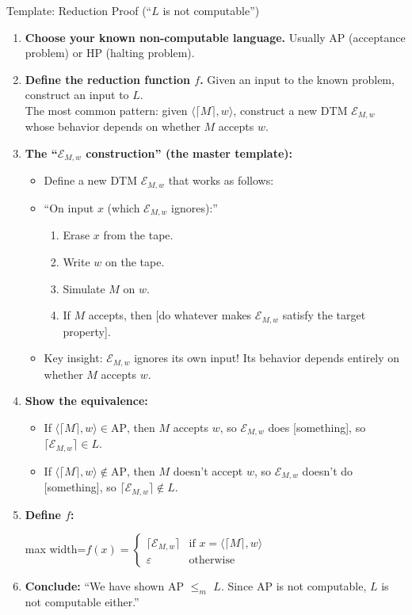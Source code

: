 \documentclass[11pt,a4paper]{article}
\newcommand{\fitmath}[1]{\begin{adjustbox}{max width=\linewidth}$\displaystyle #1$\end{adjustbox}}
\begin{document}
\begin{templatebox}{Template: Reduction Proof (``$L$ is not computable'')}
\begin{enumerate}
    \item \textbf{Choose your known non-computable language.} Usually AP (acceptance problem) or HP (halting problem).

    \item \textbf{Define the reduction function $f$.} Given an input to the known problem, construct an input to $L$.\\
    The most common pattern: given $\langle \lceil M \rceil, w \rangle$, construct a new DTM $\mathcal{E}_{M,w}$ whose behavior depends on whether $M$ accepts $w$.

    \item \textbf{The ``$\mathcal{E}_{M,w}$ construction'' (the master template):}
    \begin{itemize}
        \item Define a new DTM $\mathcal{E}_{M,w}$ that works as follows:
        \item ``On input $x$ (which $\mathcal{E}_{M,w}$ ignores):''
        \begin{enumerate}
            \item Erase $x$ from the tape.
            \item Write $w$ on the tape.
            \item Simulate $M$ on $w$.
            \item If $M$ accepts, then [do whatever makes $\mathcal{E}_{M,w}$ satisfy the target property].
        \end{enumerate}
        \item Key insight: $\mathcal{E}_{M,w}$ ignores its own input! Its behavior depends entirely on whether $M$ accepts $w$.
    \end{itemize}

    \item \textbf{Show the equivalence:}
    \begin{itemize}
        \item If $\langle \lceil M \rceil, w \rangle \in \text{AP}$, then $M$ accepts $w$, so $\mathcal{E}_{M,w}$ does [something], so $\lceil \mathcal{E}_{M,w} \rceil \in L$.
        \item If $\langle \lceil M \rceil, w \rangle \notin \text{AP}$, then $M$ doesn't accept $w$, so $\mathcal{E}_{M,w}$ doesn't do [something], so $\lceil \mathcal{E}_{M,w} \rceil \notin L$.
    \end{itemize}

    \item \textbf{Define $f$:}
    \fitmath{f(x) = \begin{cases} \lceil \mathcal{E}_{M,w} \rceil & \text{if } x = \langle \lceil M \rceil, w \rangle \\ \varepsilon & \text{otherwise} \end{cases}}

    \item \textbf{Conclude:} ``We have shown AP $\leq_m$ $L$. Since AP is not computable, $L$ is not computable either.''
\end{enumerate}
\end{templatebox}
\end{document}
